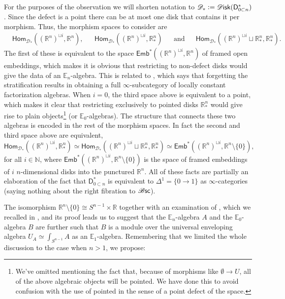 \documentclass[../text]{subfiles}
\begin{document}
\begin{observation}\label{obs:explore_D*}
    For the purposes of the observation we will shorten notation to $\mathscr{D}_* := \disk (\mathsf{D}_{0 \subset n}^*)$. Since the defect is a point there can be at most one disk that contains it per morphism. Thus, the morphism spaces to consider are
    \begin{align}
        &\mathsf{Hom}_{\mathscr{D}_*} ((\mathbb{R}^n)^{\sqcup i}, \mathbb{R}^n),& &\mathsf{Hom}_{\mathscr{D}_*} ((\mathbb{R}^n)^{\sqcup i}, \mathbb{R}^n_*)& &\mathrm{and}& &\mathsf{Hom}_{\mathscr{D}_*} ((\mathbb{R}^n)^{\sqcup i} \sqcup \mathbb{R}^n_*, \mathbb{R}^n_*).&
    \end{align}
    The first of these is equivalent to the space $\mathsf{Emb}^*((\mathbb{R}^n)^{\sqcup i}, \mathbb{R}^n)$ of framed open embeddings, which makes it is obvious that restricting to non-defect disks would give the data of an $\mathbb{E}_n$-algebra. This is related to , which says that forgetting the stratification results in obtaining a full $\infty$-subcategory of locally constant factorization algebras. When $i=0$, the third space above is equivalent to a point, which makes it clear that restricting exclusively to pointed disks $\mathbb{R}^n_*$ would give rise to plain objects\footnote{We've omitted mentioning the fact that, because of morphisms like $\emptyset \xrightarrow{} U$, all of the above algebraic objects will be pointed. We have done this to avoid confusion with the use of pointed in the sense of a point defect of the space.} (or $\mathbb{E}_0$-algebras). The structure that connects these two algebras is encoded in the rest of the morphism spaces. In fact the second and third space above are equivalent,
    \begin{equation}
        \mathsf{Hom}_{\mathscr{D}_*} ((\mathbb{R}^n)^{\sqcup i}, \mathbb{R}^n_*) \simeq \mathsf{Hom}_{\mathscr{D}_*} ((\mathbb{R}^n)^{\sqcup i} \sqcup \mathbb{R}^n_*, \mathbb{R}^n_*) \simeq \mathsf{Emb}^* ((\mathbb{R}^n)^{\sqcup i}, \mathbb{R}^n \setminus \{0\}),
    \end{equation}
    for all $i \in \mathbb{N}$, where $\mathsf{Emb}^* ((\mathbb{R}^n)^{\sqcup i}, \mathbb{R}^n \setminus \{0\})$ is the space of framed embeddings of $i$ $n$-dimensional disks into the punctured $\mathbb{R}^n$. All of these facts are partially an elaboration of the fact that $\mathsf{D}_{0 \subset n}^*$ is equivalent to $\Delta^1 = \{0 \xrightarrow{} 1\}$ as $\infty$-categories (saying nothing about the right fibration to $\mathscr{B} \mathsf{sc}$). 

    The isomorphism $\mathbb{R}^n \setminus \{ 0 \} \cong S^{n-1} \times \mathbb{R}$ together with an examination of \cite[prop.3.16]{francis2013}, which we recalled in , and its proof leads us to suggest that the $\mathbb{E}_n$-algebra $A$ and the $\mathbb{E}_0$-algebra $B$ are further such that $B$ is a module over the universal enveloping algebra $U_A \simeq \int_{S^{n-1}} A$ as an $\mathbb{E}_1$-algebra. Remembering that we limited the whole discussion to the case when $n>1$, we propose:
\end{observation}
\end{document}
